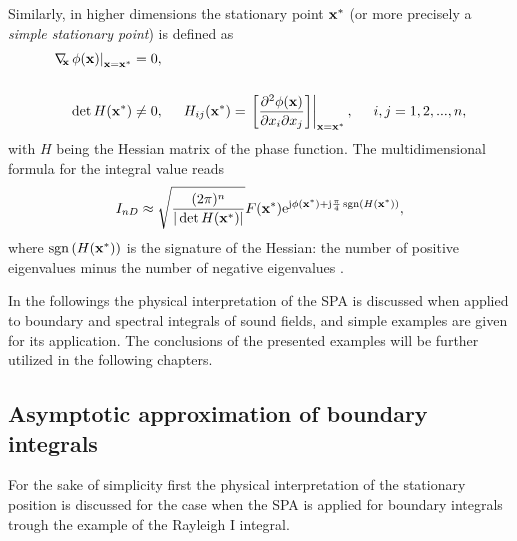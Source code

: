 \vspace{3mm}
Similarly, in higher dimensions the stationary point $\mathbf{x}^*$ (or more precisely a \emph{simple stationary point}) is defined as
\begin{align}
\label{Eq:ndim_stat_point}
\begin{split}
\left.
\Dx \phi(\vx)\right|_{\vx = \vx^*} &= 0,
\\ \vspace{3mm} \\
\det H(\vx^*) &\neq 0,
\hspace{5mm} 
H_{ij}(\vx^*) = \left. \left[
\frac{\partial^2 \phi(\vx)}{\partial x_i \partial x_j} 
\right] \right|_{\vx = \vx^*},
\hspace{5mm}
i,j = 1,2,...,n,
\end{split}
\end{align}
with $H$ being the Hessian matrix of the phase function.
The multidimensional formula for the integral value reads
\begin{equation}
\label{Eq:SPAResult_nd}
I_{nD} \approx \sqrt{\frac{(2\pi)^n}{|\det H(\mathbf{x}^*)|}} F(\mathbf{x}^*) \mathrm{e}^{\mathrm{j} \phi(\mathbf{x}^*) + \mathrm{j} \frac{\pi}{4}\,\mathrm{sgn}\left( H(\mathbf{x}^*) \right)},
\end{equation}
where $\mathrm{sgn}\left( H(\mathbf{x}^*) \right)$ is the signature of the Hessian: the number of positive eigenvalues minus the number of negative eigenvalues \cite{Bleistein2000}.

In the followings the physical interpretation of the SPA is discussed when applied to boundary and spectral integrals of sound fields, and simple examples are given for its application.
The conclusions of the presented examples will be further utilized in the following chapters.

\subsection{Asymptotic approximation of boundary integrals}
\label{Sec:HS_approx:SPA_for_Rayleigh}
For the sake of simplicity first the physical interpretation of the stationary position is discussed for the case when the SPA is applied for boundary integrals trough the example of the Rayleigh I integral.
%

